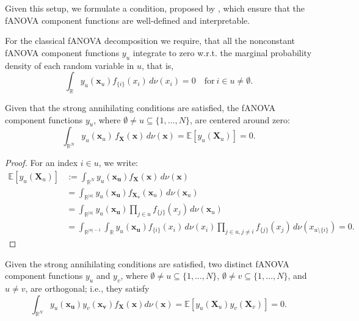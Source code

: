 Given this setup, we formulate a condition, proposed by \cite{rahman2014}, which ensure that the fANOVA component functions are well-defined and interpretable.
\begin{condition}\label{cond:strong_annihilating_conditions}
    For the classical fANOVA decomposition we require, that all the nonconstant fANOVA component functions $y_u$ integrate to zero w.r.t. the marginal probability density of each random variable in $u$, that is,
\begin{equation}
    \int_{\mathbb{R}} y_u(\boldsymbol{x}_u) f_{\{i\}}(x_i) \, d\nu(x_i) = 0 \quad \text{for} \ i \in u \neq \emptyset.
\end{equation}
\end{condition}

\begin{proposition}\label{prop:zero_mean_classical}
Given that the strong annihilating conditions are satisfied, 
the fANOVA component functions $y_u$, where 
$\emptyset \neq u \subseteq \{1,\dots,N\}$, are centered around zero:
\begin{equation}
    \int_{\mathbb{R}^N} 
        y_u(\boldsymbol{x}_u)\, f_{\boldsymbol{X}}(\boldsymbol{x}) 
        \, d\nu (\boldsymbol{x})
    = \mathbb{E}[y_u(\boldsymbol{X}_u)] 
    = 0.
\end{equation}
\end{proposition}

\begin{proof}
    For an index $i \in u$, we write:
\begin{align*}
    \mathbb{E}[y_u(\boldsymbol{X}_u)] &:= \int_{\mathbb{R}^{N}} y_u(\boldsymbol{x_u}) f_{\boldsymbol{X}}(\boldsymbol{x}) \, d\nu (\boldsymbol{x}) \\[0.5em]
    &= \int_{\mathbb{R}^{|u|}} y_u(\boldsymbol{x_u}) f_{\boldsymbol{X}_u}(\boldsymbol{x}_u) \, d\nu (\boldsymbol{x}_u) \\[0.5em]
    &= \int_{\mathbb{R}^{|u|}} y_u(\boldsymbol{x_u}) \prod_{j \in u} f_{\{j\}}(x_j) \, d\nu (\boldsymbol{x}_u) \\[0.5em]
    &= \int_{\mathbb{R}^{|u|-1}} \int_{\mathbb{R}} y_u(\boldsymbol{x_u}) f_{\{i\}}(x_i) \, d\nu(x_i) \prod_{j \in u, j \neq i} f_{\{j\}}(x_j) \, d\nu (x_{u \setminus \{i\}}) = 0.
\end{align*}
\end{proof}

\begin{proposition}\label{prop:orthogonality_classical}
    Given the strong annihilating conditions are satisfied, two distinct fANOVA component functions $y_u$ and $y_v$, where $\emptyset \neq u \subseteq \{1,\ldots,N\}$, $\emptyset \neq v \subseteq \{1,\ldots,N\}$, and $u \neq v$, are orthogonal; i.e., they satisfy
\begin{equation}
    \int_{\mathbb{R}^N} y_u(\boldsymbol{x_u}) y_v(\boldsymbol{x_v}) f_{\boldsymbol{X}}(\boldsymbol{x}) d\nu (\boldsymbol{x}) = \mathbb{E}[y_u(\boldsymbol{X}_u) y_v(\boldsymbol{X}_v)] = 0.
\end{equation}
\end{proposition}

